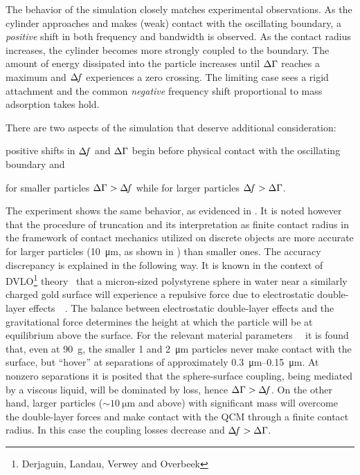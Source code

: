 The behavior of the simulation closely matches
experimental observations.  As the cylinder approaches and makes (weak)
contact with the oscillating boundary, a \textit{positive} shift in both
frequency and bandwidth is observed.  As the contact radius increases, the
cylinder becomes more strongly coupled to the boundary. The amount of energy
dissipated into the particle increases until $\Delta\Gamma$ reaches a maximum and
$\Delta\!f$ experiences a zero crossing.  The limiting case sees a rigid
attachment and the common \textit{negative} frequency shift proportional to
mass adsorption takes hold.  

There are two aspects of the simulation that deserve additional
consideration:%
\begin{inparaenum}[(1)]
\item positive shifts in $\Delta\!f$ and $\Delta\Gamma$ begin 
before physical contact with the oscillating boundary and 
\item for smaller particles $\Delta\Gamma>\Delta\!f$ while for
larger particles $\Delta\!f>\Delta\Gamma$.
\end{inparaenum}

The experiment shows the same behavior, as evidenced in
.  It is noted however that the procedure of
truncation and its interpretation as finite contact radius in the framework
of contact mechanics utilized on discrete objects are more accurate for
larger particles (\SI{10}{\micro\meter}, as shown in
) than smaller ones.  The accuracy discrepancy is
explained in the following way.  It is known in the context of
DVLO\footnote{Derjaguin, Landau, Verwey and Overbeek}
theory~\cite{israelachvili2011intermolecular} that a micron-sized
polystyrene sphere in water near a similarly charged gold surface will
experience a repulsive force due to electrostatic double-layer
effects~\cite{alexander1987hydrodynamic}~\cite{flicker1993quantifying}.
The balance between electrostatic double-layer effects and the
gravitational force determines the height at which the particle will be at
equilibrium above the surface.  For the relevant material
parameters~\cite{israelachvili2011intermolecular}~\cite{sharma1992factors}
it is found that, even at \SI{90}{g}, the smaller \num{1} and
\SI{2}{\micro\meter} particles never make contact with the surface, but
``hover'' at separations of approximately
\SIrange{0.3}{0.15}{\micro\meter}.  At nonzero separations it is posited
that the sphere-surface coupling, being mediated by a viscous liquid, will
be dominated by loss, hence $\Delta\Gamma>\Delta\!f$.  On the other hand, larger particles
($\sim\SI{10}{\micro\meter}$ and above) with significant mass will overcome
the double-layer forces and make contact with the QCM through a finite
contact radius.  In this case the coupling losses decrease and $\Delta\!f>\Delta\Gamma$.

